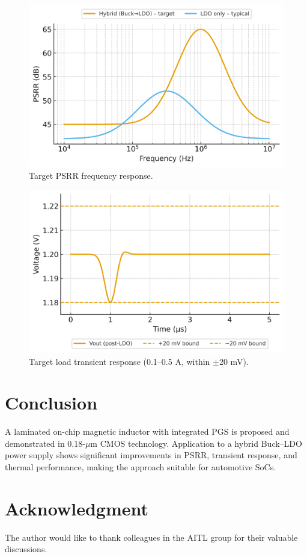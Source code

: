 \documentclass[journal]{IEEEtran}
\begin{document}
\begin{figure}[!t]
\centering
\includegraphics[width=0.8\linewidth]{fig/fig4_psrr_target.png}
\caption{Target PSRR frequency response.}
\label{fig4}
\end{figure}

\begin{figure}[!t]
\centering
\includegraphics[width=0.8\linewidth]{fig/fig5_transient_response.png}
\caption{Target load transient response (0.1--0.5 A, within $\pm$20 mV).}
\label{fig5}
\end{figure}

\section{Conclusion}
A laminated on-chip magnetic inductor with integrated PGS is proposed and demonstrated in 0.18-$\mu$m CMOS technology. Application to a hybrid Buck--LDO power supply shows significant improvements in PSRR, transient response, and thermal performance, making the approach suitable for automotive SoCs.

\section*{Acknowledgment}
The author would like to thank colleagues in the AITL group for their valuable discussions.
\end{document}
